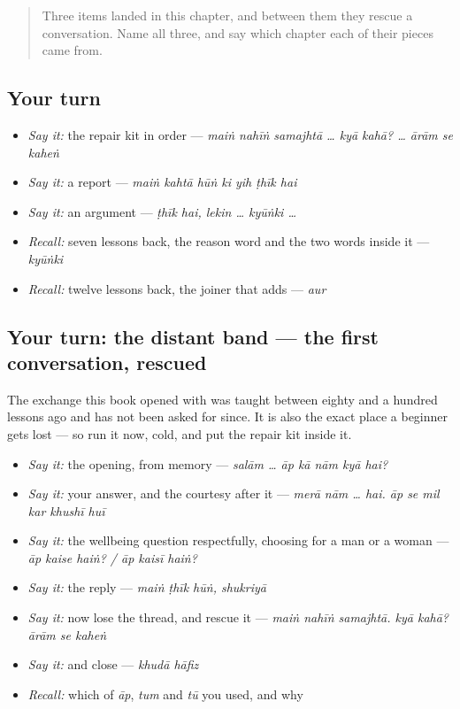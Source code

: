 \begin{quote}
Three items landed in this chapter, and between them they rescue a conversation. Name all three, and say which chapter each of their pieces came from.
\end{quote}

\subsection*{Your turn}
\begin{itemize}
\raggedright
  \item \emph{Say it:} the repair kit in order — \emph{maiṅ nahīṅ samajhtā … kyā kahā? … ārām se kaheṅ}
  \item \emph{Say it:} a report — \emph{maiṅ kahtā hūṅ ki yih ṭhīk hai}
  \item \emph{Say it:} an argument — \emph{ṭhīk hai, lekin … kyūṅki …}
  \item \emph{Recall:} seven lessons back, the reason word and the two words inside it — \emph{kyūṅki}
  \item \emph{Recall:} twelve lessons back, the joiner that adds — \emph{aur}
\end{itemize}

\subsection*{Your turn: the distant band — the first conversation, rescued}
The exchange this book opened with was taught between eighty and a hundred lessons ago and has not been asked for since. It is also the exact place a beginner gets lost — so run it now, cold, and put the repair kit inside it.

\begin{itemize}
\raggedright
  \item \emph{Say it:} the opening, from memory — \emph{salām … āp kā nām kyā hai?}
  \item \emph{Say it:} your answer, and the courtesy after it — \emph{merā nām … hai. āp se mil kar khushī huī}
  \item \emph{Say it:} the wellbeing question respectfully, choosing for a man or a woman — \emph{āp kaise haiṅ? / āp kaisī haiṅ?}
  \item \emph{Say it:} the reply — \emph{maiṅ ṭhīk hūṅ, shukriyā}
  \item \emph{Say it:} now lose the thread, and rescue it — \emph{maiṅ nahīṅ samajhtā. kyā kahā? ārām se kaheṅ}
  \item \emph{Say it:} and close — \emph{khudā hāfiz}
  \item \emph{Recall:} which of \emph{āp}, \emph{tum} and \emph{tū} you used, and why
\end{itemize}

